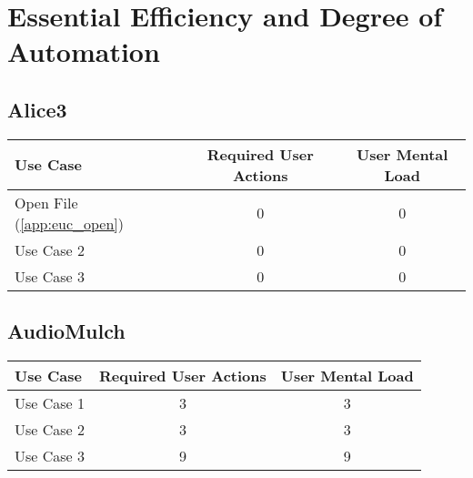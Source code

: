 \section{Essential Efficiency and Degree of Automation}

\subsection*{Alice3}

\begin{tabularx}{\textwidth}{Xcc}
\textbf{Use Case} & \textbf{Required User Actions} & \textbf{User Mental Load}\\
\hline
Open File (\ref{app:euc_open}) & 0 & 0 \\
Use Case 2                     & 0 & 0 \\
Use Case 3                     & 0 & 0
\end{tabularx}

\subsection*{AudioMulch}




\begin{tabularx}{\textwidth}{Xcc}
\textbf{Use Case} & \textbf{Required User Actions} & \textbf{User Mental Load}\\
\hline
Use Case 1                          & 3 & 3 \\
Use Case 2                          & 3 & 3 \\
Use Case 3                          & 9 & 9
\end{tabularx}

